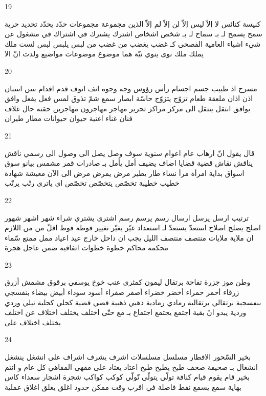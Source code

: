\documentclass[twocolumn,a4paper]{article}
\begin{document}
19

\textarabic{ كنيسة  كنائس  
 لا إلاّ ليس إلاّ لن إلاّ  لم إلاّ  
 الذين  
 مجموعة  مجموعات
 حدّد  يحدّد   
 تحديد  
 حرية  
 سمح  يسمح لـ بـ  
 سماح لـ بـ  
 شخص  اشخاص  
 اشترك  يشترك في   
 اشتراك في  
 مشغول عن  
 شيء  اشياء  
 العامية  
 الفصحى  
 كـ  
 غضب  يغضب من   
 غضب من  
 لبس  يلبس   
 لبس  
 لست  
 ملك  يملك  
 ملك  
 نوى  ينوي  
 نيّة  
 هما  
 موضوع  موضوعات
 مواضيع  
 ولدت  
 انّ  
 الا  
}

20

\textarabic{ مسرح  
 اذ  
 طبيب  
 جسم  اجسام  
 رأس  رؤوس  
 وجه  وجوه  
 انف  انوف  
 قدم  اقدام  
 سن  اسنان  
 اذن  اذان  
 ملعقة  
 طعام  
 تزوّج  يتزوّج   
 حاسّة  
 ابصار  
 سمع  
 شمّ  
 تذوق  
 لمس  
 فعل  يفعل   
 وافق  يوافق   
 انتقل  ينتقل الى  
 مركز  مراكز  
 تحرير  
 مهاجر  مهاجرون
  مهاجرين
  حقنة  
 حال  
 غلاف  
 فنان  
 غناء  
 اغنية  
 حيوان  حيوانات
 مطار  
 طيران  
}

21

\textarabic{ قال  يقول انّ   
 ارهاب  
 عام  اعوام  
 سنوية  
 سوف  
 وصل  يصل الى  
 وصول الى  
 رسمي  
 ناقش  يناقش  
 نقاش  
 قضية  قضايا  
 اضاف  يضيف   
 أمل  يأمل بـ   
 صادرات  
 قمر  
 مشمس  
 بيانو  
 سوق  اسواق  
 بداية  
 امرأة  مرأ  
 نساء  
 طار  يطير   
 مرض  يمرض   
 مرض  
 الى اﻵن  
 معيشة  
 شهادة  
 خطيب  خطيبة  
 تخصّص  يتخصّص   
 تخصّص  
 اي  
 ياترى  
 رتّب  يرتّب   
}

22

\textarabic{ ترتيب  
 ارسل  يرسل  ارسال   
 رسم  يرسم   
 رسم  
 اشترى  يشتري   
 شراء  
 شهر  اشهر  شهور  
 اصلح  يصلح  اصلاح   
 استعدّ  يستعدّ لـ  استعداد   
 غيّر  يغيّر  تغيير   
 فوطة  فوط  
 اقلّ من  
 من اللازم ان  
 ملاية  ملايات
 منتصف  
 منتصف الليل  
 يجب ان  
 داحل  
 خارج  
 عيد  اعياد  
 ممل  
 ممتع  
 سّماء  
 محكمة  محاكم  
 خطوة  خطوات
 اتفاقية  
 ضمن  
 عاجل  
 هجرة  
}

23

\textarabic{ وطن  
 موز  
 جزرة  
 تفاحة  
 برتقال  
 ليمون  
 كمثرى  
 عنب  
 خوخ  
 يوسفي  
 برقوق  
 مشمش  
 أزرق  زرقاء  
 أحمر  حمراء  
 أخضر  خضراء  
 أصفر  صفراء  
 أسود  سوداء  
 أبيض  بيضاء  
 بنفسجي  بنفسجية  
 برتقالي  برتقالية  
 رمادي  رمادية  
 ذهبي  ذهبية  
 فضي  فضية  
 كحلي  كحلية  
 نيلي  
 وردي  وردية  
 يبدو انّ  
 بقية  
 اجتمع  يجتمع  اجتماع بـ  مع   
 حتّى  
 اختلف  يختلف  اختلاف عن   
 اختلف  يختلف  اختلاف على   
}

24

\textarabic{ بخير  
 السّحور  
 الافطار  
 مسلسل  مسلسلات
 اشرف  يشرف  اشراف على  
 انشغل  ينشغل  انشغال بـ  
 صحيفة  صحف  
 طبخ  يطبخ  
 طبخ  
 اعتاد  يعتاد على  
 مقهى المقاهي  
 كل عام و انتم بخير  
 قام  يقوم  
 قيام  
 كنافة  
 تولّى  يتولّى  
 تّولّي  
 كوكب  كواكب  
 شجرة  اشجار   
 سعداء  
 كاس  
 بهاية  
 سمع  يسمع  
 نقط  
 فاصلة  
 في اقرب وقت ممكن  
 حدود  
 اغلق  يغلق  اغلاق   
 عملية  
}
\end{document}
